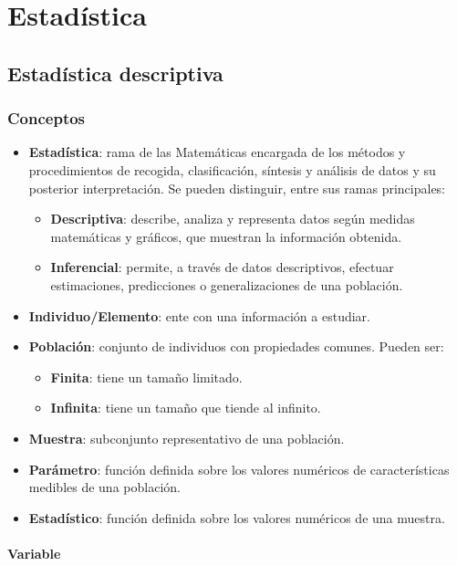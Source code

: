 \chapter{Estadística}
\section{Estadística descriptiva}
\subsection{Conceptos}
\begin{itemize}[itemsep=0pt,parsep=0pt,topsep=0pt,partopsep=0pt]
    \item \textbf{Estadística}: rama de las Matemáticas encargada de los métodos y procedimientos de recogida, clasificación, síntesis y análisis de datos y su posterior interpretación. Se pueden distinguir, entre sus ramas principales:
    \begin{itemize}[itemsep=0pt,parsep=0pt,topsep=0pt,partopsep=0pt]
        \item\textbf{Descriptiva}: describe, analiza y representa datos según medidas matemáticas y gráficos, que muestran la información obtenida.
        \item\textbf{Inferencial}: permite, a través de datos descriptivos, efectuar estimaciones, predicciones o generalizaciones de una población.
    \end{itemize}
    \item \textbf{Individuo/Elemento}: ente con una información a estudiar.
    \item\textbf{Población}: conjunto de individuos con propiedades comunes. Pueden ser:
    \begin{itemize}[itemsep=0pt,parsep=0pt,topsep=0pt,partopsep=0pt]
        \item \textbf{Finita}: tiene un tamaño limitado.
        \item\textbf{Infinita}: tiene un tamaño que tiende al infinito.
    \end{itemize}
    \item\textbf{Muestra}: subconjunto representativo de una población.
    \item\textbf{Parámetro}: función definida sobre los valores numéricos de características medibles de una población.
    \item\textbf{Estadístico}: función definida sobre los valores numéricos de una muestra.
\end{itemize}
\subsubsection{Variable}
